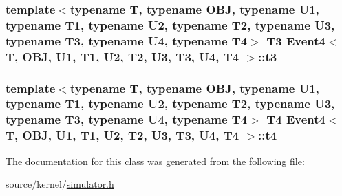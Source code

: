 \hypertarget{classEvent4_44d2b08b43f20fac8f5cb3666e63cc52}{
\subsubsection[{t3}]{\setlength{\rightskip}{0pt plus 5cm}template$<$typename T, typename OBJ, typename U1, typename T1, typename U2, typename T2, typename U3, typename T3, typename U4, typename T4$>$ T3 {\bf Event4}$<$ T, OBJ, U1, T1, U2, T2, U3, T3, U4, T4 $>$::{\bf t3}}}
\label{classEvent4_44d2b08b43f20fac8f5cb3666e63cc52}


\hypertarget{classEvent4_0a7fbdc85c74aececd3b997574ac0875}{
\subsubsection[{t4}]{\setlength{\rightskip}{0pt plus 5cm}template$<$typename T, typename OBJ, typename U1, typename T1, typename U2, typename T2, typename U3, typename T3, typename U4, typename T4$>$ T4 {\bf Event4}$<$ T, OBJ, U1, T1, U2, T2, U3, T3, U4, T4 $>$::{\bf t4}}}
\label{classEvent4_0a7fbdc85c74aececd3b997574ac0875}




The documentation for this class was generated from the following file:\begin{CompactItemize}
\item 
source/kernel/\hyperlink{simulator_8h}{simulator.h}\end{CompactItemize}
